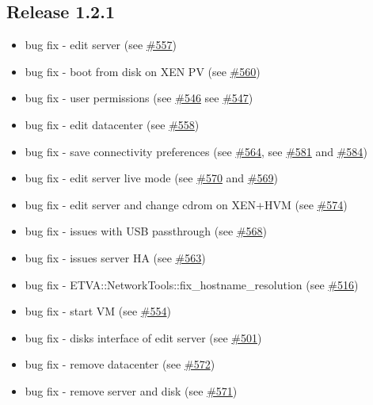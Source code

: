 \subsection{Release 1.2.1}

\begin{itemize}
\item bug fix - edit server (see \href{https://srcmaster.eurotux.com/pm/p/etva/ticket/557}{\#557})
\item bug fix - boot from disk on XEN PV (see \href{https://srcmaster.eurotux.com/pm/p/etva/ticket/560}{\#560})
\item bug fix - user permissions (see \href{https://srcmaster.eurotux.com/pm/p/etva/ticket/546}{\#546} see \href{https://srcmaster.eurotux.com/pm/p/etva/ticket/547}{\#547})
\item bug fix - edit datacenter (see \href{https://srcmaster.eurotux.com/pm/p/etva/ticket/558}{\#558})
\item bug fix - save connectivity preferences (see \href{https://srcmaster.eurotux.com/pm/p/etva/ticket/564}{\#564}, see \href{https://srcmaster.eurotux.com/pm/p/etva/ticket/581}{\#581} and \href{https://srcmaster.eurotux.com/pm/p/etva/ticket/584}{\#584})
\item bug fix - edit server live mode (see \href{https://srcmaster.eurotux.com/pm/p/etva/ticket/570}{\#570} and \href{https://srcmaster.eurotux.com/pm/p/etva/ticket/569}{\#569})
\item bug fix - edit server and change cdrom on XEN+HVM (see \href{https://srcmaster.eurotux.com/pm/p/etva/ticket/574}{\#574})
\item bug fix - issues with USB passthrough (see \href{https://srcmaster.eurotux.com/pm/p/etva/ticket/568}{\#568})
\item bug fix - issues server HA (see \href{https://srcmaster.eurotux.com/pm/p/etva/ticket/563}{\#563})
\item bug fix - ETVA::NetworkTools::fix\_hostname\_resolution (see \href{https://srcmaster.eurotux.com/pm/p/etva/ticket/516}{\#516})
\item bug fix - start VM (see \href{https://srcmaster.eurotux.com/pm/p/etva/ticket/554}{\#554})
\item bug fix - disks interface of edit server (see \href{https://srcmaster.eurotux.com/pm/p/etva/ticket/501}{\#501})
\item bug fix - remove datacenter (see \href{https://srcmaster.eurotux.com/pm/p/etva/ticket/572}{\#572})
\item bug fix - remove server and disk (see \href{https://srcmaster.eurotux.com/pm/p/etva/ticket/571}{\#571})

\end{itemize}
